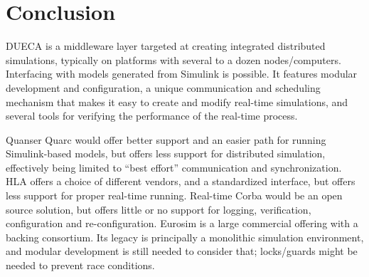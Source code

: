 \documentclass[11pt,a4paper,twoside]{scrreprt}
\begin{document}
\chapter{Conclusion}

DUECA is a middleware layer targeted at creating integrated distributed simulations, typically on platforms with several to a dozen nodes/computers. Interfacing with models generated from Simulink is possible. It features modular development and configuration, a unique communication and scheduling mechanism that makes it easy to create and modify real-time simulations, and several tools for verifying the performance of the real-time process.

Quanser Quarc would offer better support and an easier path for running Simulink-based models, but offers less support for distributed simulation, effectively being limited to ``best effort'' communication and synchronization. HLA offers a choice of different vendors, and a standardized interface, but offers less support for proper real-time running. Real-time Corba would be an open source solution, but offers little or no support for logging, verification, configuration and re-configuration. Eurosim is a large commercial offering with a backing consortium. Its legacy is principally a monolithic simulation environment, and modular development is still needed to consider that; locks/guards might be needed to prevent race conditions.


\end{document}

